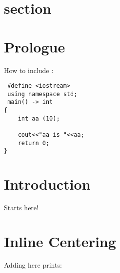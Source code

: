 \ifTOC 
\else
        {\small \singlespacing\tableofcontents}
    \np
\fi %

\def\xfigPath{./_xuti/xfig/}
\def\bibPath{./_xuti/bib/}
\graphicspath{{\xfigPath}}

\np
{}

\section{section}\label{sec:section}

\section*{Prologue}

\nl How to include \Cpp:
 \begin{lstlisting}
 #define <iostream>
 using namespace std;
 main() -> int
{
    int aa (10);
    
    cout<<"aa is "<<aa;
    return 0;
}
\end{lstlisting}


\section{Introduction} \label{sec:intro}
Starts here!

\section{Inline Centering}


\vspace*{2\baselineskip}
\nl Adding  here prints:
\secline



